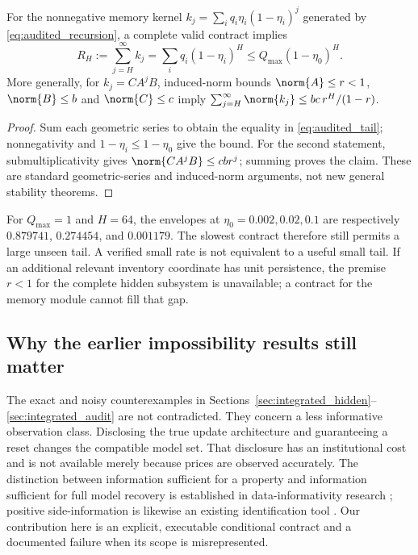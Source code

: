 \begin{proposition}
\label{prop:audited_tail}
For the nonnegative memory kernel $k_j=\sum_iq_i\eta_i(1-\eta_i)^j$ generated by \cref{eq:audited_recursion}, a complete valid contract implies
\begin{equation}
 R_H:=\sum_{j=H}^{\infty}k_j
 =\sum_iq_i(1-\eta_i)^H
 \le Q_{\max}(1-\eta_0)^H.
 \label{eq:audited_tail}
\end{equation}
More generally, for $k_j=CA^jB$, induced-norm bounds $\norm{A}\le r<1$, $\norm{B}\le b$ and $\norm{C}\le c$ imply
$\sum_{j=H}^{\infty}\norm{k_j}\le bc\,r^H/(1-r)$.
\end{proposition}
\begin{proof}
Sum each geometric series to obtain the equality in \cref{eq:audited_tail}; nonnegativity and $1-\eta_i\le1-\eta_0$ give the bound. For the second statement, submultiplicativity gives $\norm{CA^jB}\le cb r^j$; summing proves the claim. These are standard geometric-series and induced-norm arguments, not new general stability theorems.
\end{proof}

For $Q_{\max}=1$ and $H=64$, the envelopes at $\eta_0=0.002,0.02,0.1$ are respectively $0.879741$, $0.274454$, and $0.001179$. The slowest contract therefore still permits a large unseen tail. A verified small rate is not equivalent to a useful small tail. If an additional relevant inventory coordinate has unit persistence, the premise $r<1$ for the complete hidden subsystem is unavailable; a contract for the memory module cannot fill that gap.

\subsection{Why the earlier impossibility results still matter}
The exact and noisy counterexamples in Sections~\ref{sec:integrated_hidden}--\ref{sec:integrated_audit} are not contradicted. They concern a less informative observation class. Disclosing the true update architecture and guaranteeing a reset changes the compatible model set. That disclosure has an institutional cost and is not available merely because prices are observed accurately. The distinction between information sufficient for a property and information sufficient for full model recovery is established in data-informativity research \citep{vanwaarde2020}; positive side-information is likewise an existing identification tool \citep{khosravi2025}. Our contribution here is an explicit, executable conditional contract and a documented failure when its scope is misrepresented.

